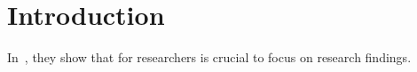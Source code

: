 

\section{Introduction \label{sec:introduction}}
	In~\cite{ACleverResearcher2023}, they show that for researchers is crucial to focus on research findings.
	